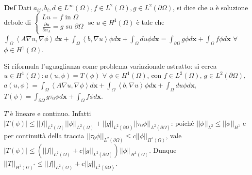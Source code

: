 \documentclass{article}
\begin{document}
\textbf{Def} Dati $a_{ij},b_{i},d\in L^{\infty }\left( \Omega \right) ,f\in
L^{2}\left( \Omega \right) ,g\in L^{2}\left( \partial \Omega \right) $, si
dice che $u$ \`{e} soluzione debole di $\left\{ 
\begin{array}{c}
Lu=f\text{ in }\Omega \\ 
\frac{\partial u}{\partial n_{A}}=g\text{ su }\partial \Omega%
\end{array}%
\right. $ se $u\in H^{1}\left( \Omega \right) $ \`{e} tale che $\int_{\Omega
}\left\langle A\nabla u,\nabla \phi \right\rangle d\mathbf{x}+\int_{\Omega
}\left\langle b,\nabla u\right\rangle \phi d\mathbf{x}+\int_{\Omega }du\phi d%
\mathbf{x}=\int_{\partial \Omega }g\phi d\mathbf{x}+\int_{\Omega }f\phi d%
\mathbf{x}$ $\forall $ $\phi \in H^{1}\left( \Omega \right) $.

Si riformula l'uguaglianza come problema variazionale astratto: si cerca $%
u\in H^{1}\left( \Omega \right) :a\left( u,\phi \right) =T\left( \phi
\right) $ $\forall $ $\phi \in H^{1}\left( \Omega \right) $, con $f\in
L^{2}\left( \Omega \right) $, $g\in L^{2}\left( \partial \Omega \right) $, $%
a\left( u,\phi \right) =\int_{\Omega }\left\langle A\nabla u,\nabla \phi
\right\rangle d\mathbf{x}+\int_{\Omega }\left\langle b,\nabla u\right\rangle
\phi d\mathbf{x}+\int_{\Omega }du\phi d\mathbf{x}$, $T\left( \phi \right)
=\int_{\partial \Omega }g\tau _{0}\phi d\mathbf{x}+\int_{\Omega }f\phi d%
\mathbf{x}$.

$T$ \`{e} lineare e continuo. Infatti $\left\vert T\left( \phi \right)
\right\vert \leq \left\vert \left\vert f\right\vert \right\vert
_{L^{2}\left( \Omega \right) }\left\vert \left\vert \phi \right\vert
\right\vert _{L^{2}\left( \Omega \right) }+\left\vert \left\vert
g\right\vert \right\vert _{L^{2}\left( \partial \Omega \right) }\left\vert
\left\vert \tau _{0}\phi \right\vert \right\vert _{L^{2}\left( \partial
\Omega \right) }$: poich\'{e} $\left\vert \left\vert \phi \right\vert
\right\vert _{L^{2}}\leq \left\vert \left\vert \phi \right\vert \right\vert
_{H^{1}}$ e per continuit\`{a} della traccia $\left\vert \left\vert \tau
_{0}\phi \right\vert \right\vert _{L^{2}\left( \partial \Omega \right) }\leq
c\left\vert \left\vert \phi \right\vert \right\vert _{H^{1}\left( \Omega
\right) }$, vale $\left\vert T\left( \phi \right) \right\vert \leq \left(
\left\vert \left\vert f\right\vert \right\vert _{L^{2}\left( \Omega \right)
}+c\left\vert \left\vert g\right\vert \right\vert _{L^{2}\left( \partial
\Omega \right) }\right) \left\vert \left\vert \phi \right\vert \right\vert
_{H^{1}\left( \Omega \right) }$. Dunque $\left\vert \left\vert T\right\vert
\right\vert _{H^{1}\left( \Omega \right) ^{\ast }}\leq \left\vert \left\vert
f\right\vert \right\vert _{L^{2}\left( \Omega \right) }+c\left\vert
\left\vert g\right\vert \right\vert _{L^{2}\left( \partial \Omega \right) }$.
\end{document}
